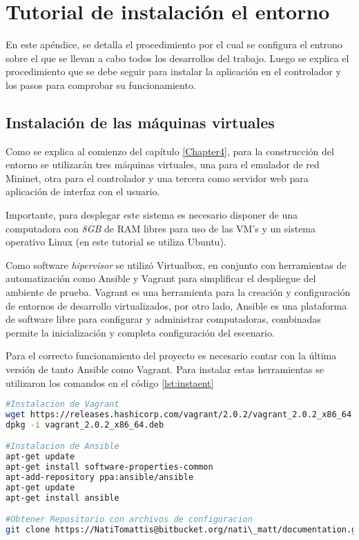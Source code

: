 
\chapter{Tutorial de instalación el entorno} %

\label{AppendixB} %

En este apéndice, se detalla el procedimiento por el cual se configura el entrono sobre el que se llevan a cabo todos los desarrollos del trabajo. Luego se explica el procedimiento que se debe seguir para instalar la aplicación en el controlador y los pasos para comprobar su funcionamiento.

\section{Instalación de las máquinas virtuales}

Como se explica al comienzo del capítulo \ref{Chapter4}, para la construcción del entorno se utilizarán tres máquinas virtuales, una para el emulador de red Mininet, otra para el controlador y una tercera como servidor web para aplicación de interfaz con el usuario. 

Importante, para desplegar este sistema es necesario disponer de una computadora con \textit{8GB} de RAM libres para uso de las VM's y un sistema operativo Linux (en este tutorial se utiliza Ubuntu). 

Como software \textit{hipervisor} se utilizó Virtualbox, en conjunto con herramientas de automatización como Ansible y Vagrant para simplificar el despliegue del ambiente de prueba. Vagrant es una herramienta para la creación y configuración de entornos de desarrollo virtualizados, por otro lado, Ansible es una plataforma de software libre para configurar y administrar computadoras, combinadas permite la inicialización y completa configuración del escenario. 

Para el correcto funcionamiento del proyecto es necesario contar con la última versión de tanto Ansible como Vagrant. Para instalar estas herramientas se utilizaron los comandos en el código \ref{lst:instaent}

\begin{lstlisting}[caption={Instalación de Vagrant y Ansible en su última versión}, captionpos=b, label={lst:instaent}, language=bash]
#Instalacion de Vagrant
wget https://releases.hashicorp.com/vagrant/2.0.2/vagrant_2.0.2_x86_64.deb
dpkg -i vagrant_2.0.2_x86_64.deb

#Instalacion de Ansible 
apt-get update
apt-get install software-properties-common
apt-add-repository ppa:ansible/ansible
apt-get update
apt-get install ansible

#Obtener Repositorio con archivos de configuracion
git clone https://NatiTomattis@bitbucket.org/nati\_matt/documentation.git

\end{lstlisting}

